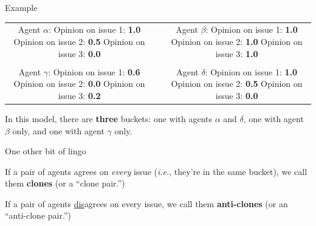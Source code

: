\documentclass[12pt]{beamer}
\begin{document}
\begin{frame}[c]{Example} %

\begin{center}
\begin{tabular}{cp{1cm}c}
\makecell{
\color{darkgreen} \small Agent $\alpha$: \\
\color{darkgreen} \footnotesize Opinion on issue 1: \textbf{1.0} \\
\color{darkgreen} \footnotesize Opinion on issue 2: \textbf{0.5} \\
\color{darkgreen} \footnotesize Opinion on issue 3: \textbf{0.0} \\
} & &
\makecell{
\color{red} \small Agent $\beta$: \\
\color{red} \footnotesize Opinion on issue 1: \textbf{1.0} \\
\color{red} \footnotesize Opinion on issue 2: \textbf{1.0} \\
\color{red} \footnotesize Opinion on issue 3: \textbf{1.0} \\
} \\
\smallskip \\
\makecell{
\color{blue} \small Agent $\gamma$: \\
\color{blue} \footnotesize Opinion on issue 1: \textbf{0.6} \\
\color{blue} \footnotesize Opinion on issue 2: \textbf{0.0} \\
\color{blue} \footnotesize Opinion on issue 3: \textbf{0.2} \\
} & &
\makecell{
\color{darkgreen} \small Agent $\delta$: \\
\color{darkgreen} \footnotesize Opinion on issue 1: \textbf{1.0} \\
\color{darkgreen} \footnotesize Opinion on issue 2: \textbf{0.5} \\
\color{darkgreen} \footnotesize Opinion on issue 3: \textbf{0.0} \\
} \\
\end{tabular}

\bigskip
{In this model, there are \textbf{three} buckets: one with agents
$\alpha$ and $\delta$, one with agent $\beta$ only, and one with agent $\gamma$
only.}
\end{center}
\end{frame}


\begin{frame}[c]{One other bit of lingo} %

\Large
If a pair of agents agrees on \textit{every} issue (\textit{i.e.}, they're in
the same bucket), we call them \textbf{clones} (or a ``clone pair.'')

\bigskip

If a pair of agents \underline{dis}agrees on every issue, we call them
\textbf{anti-clones} (or an ``anti-clone pair.'')

\end{frame}
\end{document}
